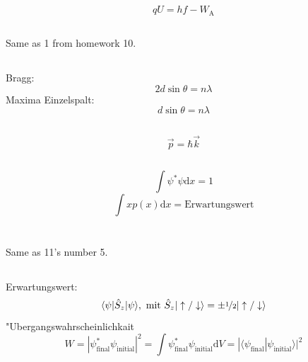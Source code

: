 \documentclass[12pt]{report}
\newcommand{\dd}{\mathrm{d}}
\begin{document}
\subsection{}
\[qU=hf-W_\mathrm{A}\]

\subsection{}
Same as 1 from homework 10.

\subsection{}
Bragg:
\[2d\sin\theta=n\lambda\]
Maxima Einzelspalt:
\[d\sin\theta=n\lambda\]

\subsection{}
\[\vec{p}=\hbar\vec{k}\]

\subsection{}
\[\int\psi^*\psi\dd x=1\]
\[\int x p(x)\dd x=\textrm{Erwartungswert}\]

\section{}

\subsection{}

Same as 11's number 5.

\subsection{}

Erwartungswert: 
\[\langle\psi|\hat{S}_z|\psi\rangle,\ \textrm{mit }\hat{S}_z|\uparrow/\downarrow\rangle=\pm\nicefrac{1}{2}|\uparrow/\downarrow\rangle\]
"Ubergangswahrscheinlichkait
\[W=|\psi^*_\mathrm{final}\psi_\mathrm{initial}|^2=\int\psi^*_\mathrm{final}\psi_\mathrm{initial}\dd V=|\langle\psi_\mathrm{final}|\psi_\mathrm{initial}\rangle|^2\]

\subsection{}
\end{document}
